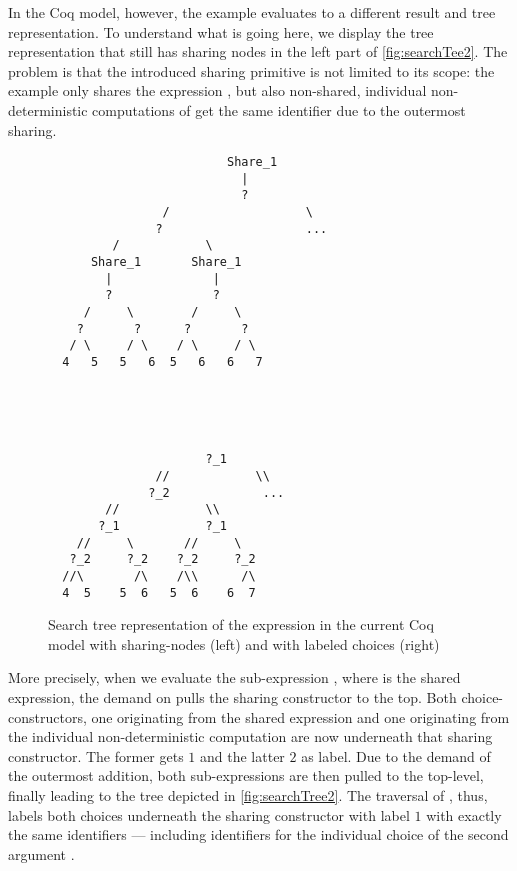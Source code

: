 In the Coq model, however, the example evaluates to a different result and tree representation.
To understand what is going here, we display the tree representation that still has sharing nodes in the left part of \autoref{fig:searchTee2}.
The problem is that the introduced sharing primitive is not limited to its scope: the example only shares the expression , but also non-shared, individual non-deterministic computations of  get the same identifier due to the outermost sharing.

\begin{figure}[h]
\begin{minipage}{0.50\textwidth}
 \centering
\begin{BVerbatim}
                         Share_1
                           |
                           ?
                /                   \
               ?                    ...
         /            \
      Share_1       Share_1
        |              |
        ?              ?
     /     \        /     \
    ?       ?      ?       ?
   / \     / \    / \     / \
  4   5   5   6  5   6   6   7
\end{BVerbatim}
\end{minipage}
\begin{minipage}{0.49\textwidth}
\centering
\begin{BVerbatim}



  
                      ?_1
               //            \\
              ?_2             ...
        //            \\
       ?_1            ?_1
    //     \       //     \
   ?_2     ?_2    ?_2     ?_2
  //\       /\    /\\      /\
  4  5    5  6   5  6    6  7
\end{BVerbatim}
\end{minipage}
\caption{Search tree representation of the expression 
  in the current Coq model with sharing-nodes (left) and with labeled
  choices (right)}
\label{fig:searchTree2}
\end{figure}

More precisely, when we evaluate the sub-expression , where  is the shared expression, the demand on  pulls the sharing constructor to the top.
Both choice-constructors, one originating from the shared expression  and one originating from the individual non-deterministic computation  are now underneath that sharing constructor.
The former gets $1$ and the latter $2$ as label.
Due to the demand of the outermost addition, both sub-expressions are then pulled to the top-level, finally leading to the tree depicted in \autoref{fig:searchTree2}.
The traversal of , thus, labels both choices underneath the sharing constructor with label $1$ with exactly the same identifiers --- including identifiers for the individual choice of the second argument .


